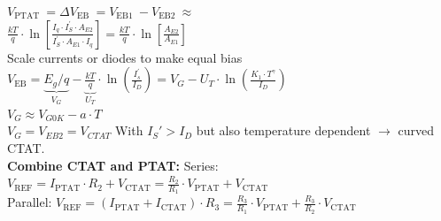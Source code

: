\documentclass[5pt,landscape]{article}
\begin{document}
\begin{multicols*}{5}
$ V_{\text {PTAT }}=\Delta V_{\text {EB }}=V_{\text {EB1 }}-V_{\text {EB2 }} \approx $\\
$ \frac{k T}{q} \cdot \ln \left[\frac{I_{q} \cdot I_{S}^{\prime} \cdot A_{E 2}}{I_{S}^{\prime} \cdot A_{E 1} \cdot I_{q}}\right]=\frac{k T}{q} \cdot \ln \left[\frac{A_{E 2}}{A_{E 1}}\right] $\\
Scale currents or diodes to make equal bias\\
$ V_{\mathrm{EB}}=\underbrace{E_{g} / q}_{V_{G}}-\underbrace{\frac{k T}{q}}_{U_{T}} \cdot \ln \left(\frac{I_{s}^{\prime}}{I_{D}}\right)=V_{G}-U_{T} \cdot \ln \left(\frac{K_{1} \cdot T^{\gamma}}{I_{D}}\right) $\\
$ V_G \approx V_{G0K} - a \cdot T  $\\
$ V_G = V_{EB2} = V_{CTAT} $
With $ I_S' > I_D $ but also temperature dependent $ \rightarrow $ curved CTAT.\\
\textbf{Combine CTAT and PTAT:}
Series: $ V_{\mathrm{REF}}=I_{\mathrm{PTAT}} \cdot R_{2}+V_{\mathrm{CTAT}}=\frac{R_{2}}{R_{1}} \cdot V_{\mathrm{PTAT}}+V_{\mathrm{CTAT}} $\\
Parallel: $ V_{\mathrm{REF}}=\left(I_{\mathrm{PTAT}}+I_{\mathrm{CTAT}}\right) \cdot R_{3}=\frac{R_{3}}{R_{1}} \cdot V_{\mathrm{PTAT}}+\frac{R_{3}}{R_{2}} \cdot V_{\mathrm{CTAT}} $\\

\end{multicols*}
\end{document}
